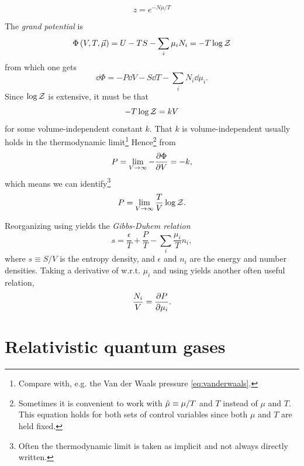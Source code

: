 \begin{equation}\label{eq:fugacity}
  z=e^{-N\mu/T}
\end{equation}

The {\it grand potential} is
\begin{equation}\label{eq:grand}
  \Phi\left(V,T,\vec{\mu}\right)=U-TS-\sum_i\mu_i N_i=-T\log\mathcal{Z}
\end{equation}
from which one gets
\begin{equation}\label{eq:1stlawgrand}
  \dd\Phi=-P\dd{V}-S\dd{T}-\sum_i N_i\dd\mu_i.
\end{equation}
Since $\log\mathcal{Z}$ is extensive, it must be that
\begin{equation}
-T\log\mathcal{Z}=kV
\end{equation}
for some volume-independent constant $k$. That $k$ is volume-independent usually
holds in the thermodynamic limit\footnote{Compare with, e.g. the Van der
Waals pressure \eqref{eq:vanderwaals}.} Hence\footnote{Sometimes it is convenient to work
with $\hat{\mu}\equiv\mu/T$ and $T$ instead of $\mu$ and $T$. This equation
holds for both sets of control variables since both $\mu$ and $T$ are
held fixed.} from 
\begin{equation}
P=\lim_{V\to\infty}-\pdv{\Phi}{V}=-k,
\end{equation}
which means we can identify\footnote{Often the thermodynamic limit is taken as
implicit and not always directly written.}
\begin{equation}\label{eq:pgrand}
P=\lim_{V\to\infty}\frac{T}{V}\log\mathcal{Z}.
\end{equation}

Reorganizing  using 
yields the {\it Gibbs-Duhem relation}
\begin{equation}
  s=\frac{\epsilon}{T}+\frac{P}{T}-\sum_i\frac{\mu_i}{T}n_i,
\end{equation}
where $s\equiv S/V$ is the entropy density, and $\epsilon$ and $n_i$
are the energy and number densities.
Taking a derivative of  w.r.t. $\mu_i$ and
using  yields
another often useful relation,
\begin{equation}
  \frac{N_i}{V}=\pdv{P}{\mu_i}.
\end{equation}

\section{Relativistic quantum gases}

